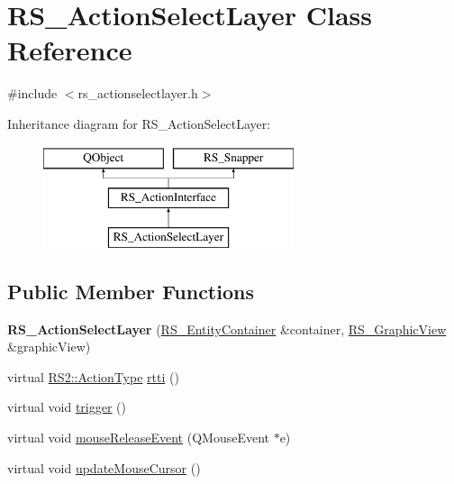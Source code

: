 \hypertarget{classRS__ActionSelectLayer}{\section{R\-S\-\_\-\-Action\-Select\-Layer Class Reference}
\label{classRS__ActionSelectLayer}
}


{\ttfamily \#include $<$rs\-\_\-actionselectlayer.\-h$>$}

Inheritance diagram for R\-S\-\_\-\-Action\-Select\-Layer\-:\begin{figure}[H]
\begin{center}
\leavevmode
\includegraphics[height=3.000000cm]{classRS__ActionSelectLayer}
\end{center}
\end{figure}
\subsection*{Public Member Functions}
\begin{DoxyCompactItemize}
\item 
\hypertarget{classRS__ActionSelectLayer_a0424711d78287a2e557255507ca1bada}{{\bfseries R\-S\-\_\-\-Action\-Select\-Layer} (\hyperlink{classRS__EntityContainer}{R\-S\-\_\-\-Entity\-Container} \&container, \hyperlink{classRS__GraphicView}{R\-S\-\_\-\-Graphic\-View} \&graphic\-View)}\label{classRS__ActionSelectLayer_a0424711d78287a2e557255507ca1bada}

\item 
virtual \hyperlink{classRS2_afe3523e0bc41fd637b892321cfc4b9d7}{R\-S2\-::\-Action\-Type} \hyperlink{classRS__ActionSelectLayer_a418bdb9e0abb251dc550e9ff2dd0b01e}{rtti} ()
\item 
virtual void \hyperlink{classRS__ActionSelectLayer_aa59109f4dd54d57129e86cc34d2e3c4f}{trigger} ()
\item 
virtual void \hyperlink{classRS__ActionSelectLayer_a7072f579e5d9edcc943c8f9b30e1a6a8}{mouse\-Release\-Event} (Q\-Mouse\-Event $\ast$e)
\item 
virtual void \hyperlink{classRS__ActionSelectLayer_a3205afaa03064abdb428a3c0242e9a86}{update\-Mouse\-Cursor} ()
\end{DoxyCompactItemize}
